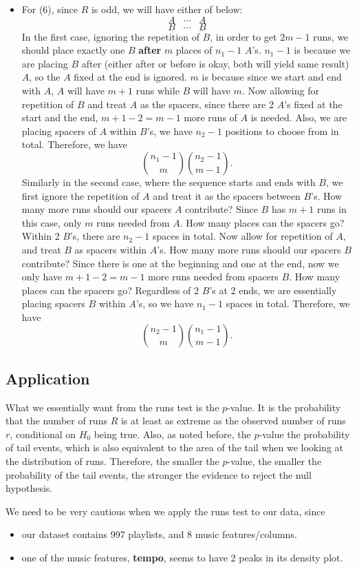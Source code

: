 \documentclass[12pt]{article}
\theoremstyle{plain}
\theoremstyle{definition}
\theoremstyle{remark}
\begin{document}
\begin{itemize}
    \item For (6), since $R$ is odd, we will have either of below: $$A\;\;\; \cdots \;\;\; A$$
    $$B\;\;\; \cdots \;\;\; B$$ In the first case, ignoring the repetition of $B$, in order to get $2m-1$ runs, we should place exactly one $B$ \textbf{after} $m$ places of $n_1-1$ $A$'s. $n_1-1$ is because we are placing $B$ after (either after or before is okay, both will yield same result) $A$, so the $A$ fixed at the end is ignored. $m$ is because since we start and end with $A$, $A$ will have $m+1$ runs while $B$ will have $m$. Now allowing for repetition of $B$ and treat $A$ as the spacers, since there are 2 $A$'s fixed at the start and the end, $m+1-2=m-1$ more runs of $A$ is needed. Also, we are placing spacers of $A$ within $B$'s, we have $n_2-1$ positions to choose from in total. Therefore, we have $$\binom{n_1-1}{m}\binom{n_2-1}{m-1}.$$ Similarly in the second case, where the sequence starts and ends with $B$, we first ignore the repetition of $A$ and treat it as the spacers between $B$'s. How many more runs should our spacers $A$ contribute? Since $B$ has $m+1$ runs in this case, only $m$ runs needed from $A$. How many places can the spacers go? Within 2 $B$'s, there are $n_2-1$ spaces in total. Now allow for repetition of $A$, and treat $B$ as spacers within $A$'s. How many more runs should our spacers $B$ contribute? Since there is one at the beginning and one at the end, now we only have $m+1-2=m-1$ more runs needed from spacers $B$. How many places can the spacers go? Regardless of 2 $B$'s at 2 ends, we are essentially placing spacers $B$ within $A$'s, so we have $n_1-1$ spaces in total. Therefore, we have $$\binom{n_2-1}{m} \binom{n_1-1}{m-1}.$$
\end{itemize}


\newpage
\subsection{Application}
What we essentially want from the runs test is the $p$-value. It is the probability that the number of runs $R$ is at least as extreme as the observed number of runs $r$, conditional on $H_0$ being true. Also, as noted before, the $p$-value the probability of tail events, which is also equivalent to the area of the tail when we looking at the distribution of runs. Therefore, the smaller the $p$-value, the smaller the probability of the tail events, the stronger the evidence to reject the null hypothesis.

We need to be very cautious when we apply the runs test to our data, since
\begin{itemize}
    \item our dataset contains 997 playlists, and 8 music features/columns. 
    \item one of the music features, \textbf{tempo}, seems to have 2 peaks in its density plot.
\end{itemize}
\end{document}
